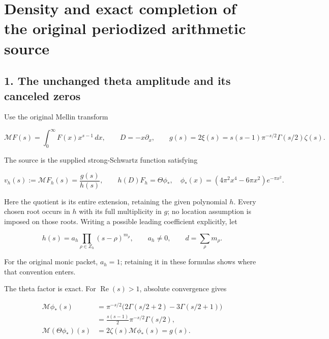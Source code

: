 \documentclass{article}
\begin{document}
\maketitle
\section{Density and exact completion of the original periodized arithmetic source}\label{density-and-exact-completion-of-the-original-periodized-arithmetic-source}

\subsection{1. The unchanged theta amplitude and its canceled zeros}\label{the-unchanged-theta-amplitude-and-its-canceled-zeros}

Use the original Mellin transform

\[
\mathcal MF(s)=\int_0^\infty F(x)x^{s-1}\,dx,
\qquad D=-x\partial_x,
\qquad g(s)=2\xi(s)=s(s-1)\pi^{-s/2}\Gamma(s/2)\zeta(s).
\tag{PSD1}
\]

The source is the supplied strong-Schwartz function satisfying

\[
v_h(s):=\mathcal MF_h(s)=\frac{g(s)}{h(s)},
\qquad h(D)F_h=\Theta\phi_*,
\quad \phi_*(x)=(4\pi^2x^4-6\pi x^2)e^{-\pi x^2}.
\tag{PSD2}
\]

Here the quotient is its entire extension, retaining the given polynomial \(h\). Every chosen root occurs in \(h\) with its full multiplicity in \(g\); no location assumption is imposed on those roots. Writing a possible leading coefficient explicitly, let

\[
h(s)=a_h\prod_{\rho\in Z_h}(s-\rho)^{m_\rho},
\qquad a_h\ne0,\qquad d=\sum_\rho m_\rho.
\tag{PSD3}
\]

For the original monic packet, \(a_h=1\); retaining it in these formulas shows where that convention enters.

The theta factor is exact. For \(\operatorname{Re}(s)>1\), absolute convergence gives

\[
\begin{aligned}
\mathcal M\phi_*(s)
&=\pi^{-s/2}\bigl(2\Gamma(s/2+2)-3\Gamma(s/2+1)\bigr)\\
&=\frac{s(s-1)}2\pi^{-s/2}\Gamma(s/2),\\
\mathcal M(\Theta\phi_*)(s)
&=2\zeta(s)\mathcal M\phi_*(s)=g(s).
\end{aligned}
\tag{PSD4}
\]
\end{document}
